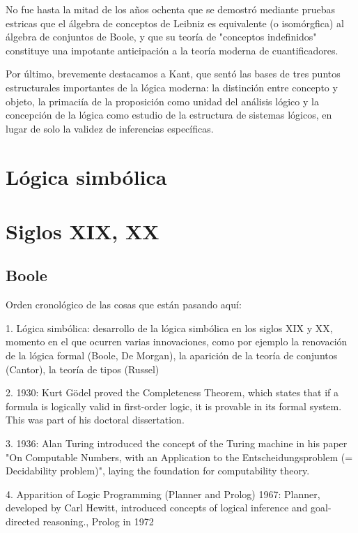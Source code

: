 \documentclass{article}
\begin{document}
No fue hasta la mitad de los años ochenta que se demostró mediante pruebas estricas que el álgebra de conceptos de Leibniz es equivalente (o isomórgfica) al álgebra de conjuntos de Boole, y que su teoría de "conceptos indefinidos" constituye una impotante anticipación a la teoría moderna de cuantificadores\cite{lenzen2004leibniz}.

Por último, brevemente destacamos a Kant, que sentó las bases de tres puntos estructurales importantes de la lógica moderna: la distinción entre concepto y objeto, la primaciía de la proposición como unidad del análisis lógico y la concepción de la lógica como estudio de la estructura de sistemas lógicos, en lugar de solo la validez de inferencias específicas\cite{tiles2004kant}.


\section{Lógica simbólica}




\section{Siglos XIX, XX}

\subsection{Boole}

Orden cronológico de las cosas que están pasando aquí:

1. Lógica simbólica: desarrollo de la
lógica simbólica en los siglos XIX y XX, momento en el que ocurren varias
innovaciones, como por ejemplo la renovación de la lógica formal (Boole, De
Morgan), la aparición de la teoría de conjuntos (Cantor), la teoría de tipos
(Russel)

2. 1930: Kurt Gödel proved the Completeness Theorem, which states that if a formula is logically valid in first-order logic, it is provable in its formal system. This was part of his doctoral dissertation.

3. 1936: Alan Turing introduced the concept of the Turing machine in his paper "On Computable Numbers, with an Application to the Entscheidungsproblem (= Decidability problem)", laying the foundation for computability theory.

4. Apparition of Logic Programming (Planner and Prolog) 
1967: Planner, developed by Carl Hewitt, introduced concepts of logical inference and goal-directed reasoning., Prolog in 1972
\end{document}
